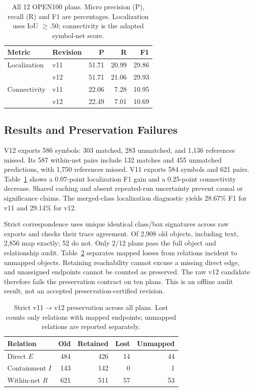 \documentclass[sigconf,review]{acmart}
\begin{document}
\begin{table}[t]
\centering
\caption{All 12 OPEN100 plans. Micro precision (P), recall (R) and F1 are percentages. Localization uses IoU $\ge .50$; connectivity is the adapted symbol-net score.}
\label{tab:benchmark}
\begin{tabular}{@{}llrrr@{}}
\toprule
Metric & Revision & P & R & F1\\
\midrule
Localization & v11 & 51.71 & 20.99 & 29.86\\
             & v12 & 51.71 & 21.06 & 29.93\\
Connectivity & v11 & 22.06 & 7.28 & 10.95\\
             & v12 & 22.49 & 7.01 & 10.69\\
\bottomrule
\end{tabular}
\end{table}

\subsection{Results and Preservation Failures}
V12 exports 586 symbols: 303 matched, 283 unmatched, and 1,136 references missed. Its 587 within-net pairs include 132 matches and 455 unmatched predictions, with 1,750 references missed. V11 exports 584 symbols and 621 pairs. Table~\ref{tab:benchmark} shows a 0.07-point localization F1 gain and a 0.25-point connectivity decrease. Shared caching and absent repeated-run uncertainty prevent causal or significance claims. The merged-class localization diagnostic yields 28.67\% F1 for v11 and 29.14\% for v12.

Strict correspondence uses unique identical class/box signatures across raw exports and checks their trace agreement. Of 2,908 old objects, including text, 2,856 map exactly; 52 do not. Only 2/12 plans pass the full object and relationship audit. Table~\ref{tab:preservation} separates mapped losses from relations incident to unmapped objects. Retaining reachability cannot excuse a missing direct edge, and unassigned endpoints cannot be counted as preserved. The raw v12 candidate therefore fails the preservation contract on ten plans. This is an offline audit result, not an accepted preservation-certified revision.

\begin{table}[t]
\centering
\caption{Strict v11$\to$v12 preservation across all plans. Lost counts only relations with mapped endpoints; unmapped relations are reported separately.}
\label{tab:preservation}
\begin{tabular}{@{}lrrrr@{}}
\toprule
Relation & Old & Retained & Lost & Unmapped\\
\midrule
Direct $E$ & 484 & 426 & 14 & 44\\
Containment $I$ & 143 & 142 & 0 & 1\\
Within-net $R$ & 621 & 511 & 57 & 53\\
\bottomrule
\end{tabular}
\end{table}
\end{document}
